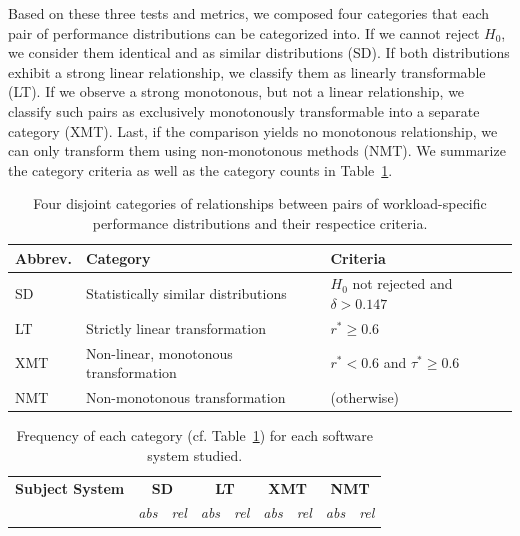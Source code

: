 {\color{black} Based on these three tests and metrics, we composed four categories that each pair of performance distributions can be categorized into. If we cannot reject $H_0$, we consider them identical and as similar distributions (\textsf{\colorbox{cs-color}{SD}}). If both distributions exhibit a strong linear relationship, we classify them as linearly transformable (\textsf{\colorbox{lt-color}{LT}}). If we observe a strong monotonous, but not a linear relationship, we classify such pairs as exclusively monotonously transformable into a separate category (\textsf{\colorbox{xmt-color}{XMT}}). Last, if the comparison yields no monotonous relationship, we can only transform them using non-monotonous methods (\textsf{\colorbox{nmt-color}{NMT}}). We summarize the category criteria as well as the category counts in Table~\ref{tab:categorization}. 

\begin{table}
	\footnotesize
	\caption{Four disjoint categories of relationships between pairs of workload-specific performance distributions and their respectice criteria.}
	\centering
\begin{tabular*}{\linewidth}{lp{3.89cm}p{3cm}}	
	\toprule
	 \textbf{Abbrev.} & \textbf{Category} & \textbf{Criteria}\\
	 \midrule
	 \cellcolor{cs-color}\textsf{SD} & {Statistically similar distributions} & {$H_0$ not rejected} and $\delta > 0.147$ \\
	 \cellcolor{lt-color}\textsf{LT} & {Strictly linear transformation} & $r^* \geq 0.6$ \\
	\cellcolor{xmt-color}\textsf{XMT} & {Non-linear, monotonous transformation} & $r^* < 0.6 $ and $ \tau^* \geq 0.6$ \\
	\cellcolor{nmt-color}\textsf{NMT} & {Non-monotonous transformation}  & (otherwise) \\%
	\bottomrule
\end{tabular*}
\label{tab:categorization}
\end{table}

\begin{table}
	\footnotesize
	\caption{Frequency of each category (cf. Table~\ref{tab:categorization}) for each software system studied.}
\begin{tabular}{lrrrrrrrr}	
	\toprule
	\textbf{Subject System} & \multicolumn{2}{c}{\textbf{\cellcolor{cs-color}\textsf{SD}}} & \multicolumn{2}{c}{\textbf{\cellcolor{lt-color}\textsf{LT}}} & \multicolumn{2}{c}{\textbf{\cellcolor{xmt-color}\textsf{XMT}}} & \multicolumn{2}{c}{\textbf{\cellcolor{nmt-color}\textsf{NMT}}}\\
	 & \textit{abs} & \textit{rel} & \textit{abs} &\textit{rel} & \textit{abs} & \textit{rel}& \textit{abs} & \textit{rel}\\
	\midrule
	

\end{tabular}
\end{table}}
